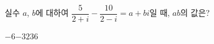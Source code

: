 실수 $a$, $b$에 대하여 $\dfrac{5}{2+i}-\dfrac{10}{2-i}=a+bi$일 때, $ab$의 값은?
\begin{choices32}{$-6$}{$-3$}{$2$}{$3$}{$6$}\end{choices32}
